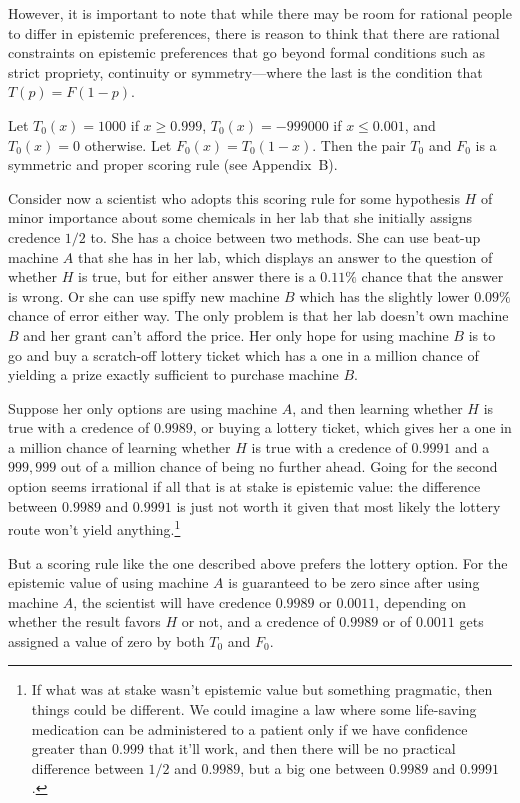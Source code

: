 However, it is important to note that while there may be room for rational people to differ in epistemic preferences, there is reason to
think that there are rational constraints on epistemic preferences that go beyond formal conditions such as strict propriety, continuity
or symmetry---where the last is the condition that $T(p)=F(1-p)$. 

Let $T_0(x)=1000$ if $x\ge 0.999$, $T_0(x)=-999000$ if $x \le 0.001$, and $T_0(x)=0$ otherwise. Let $F_0(x)=T_0(1-x)$.
Then the pair $T_0$ and $F_0$ is a symmetric and proper scoring rule (see Appendix~B).

Consider now a scientist who adopts this scoring rule for some hypothesis $H$ of minor importance about some chemicals in 
her lab that she initially assigns credence $1/2$ to. She has a choice between two methods. She can use beat-up machine $A$
that she has in her lab, which displays an answer to the question of whether $H$ is true, but for either
answer there is a $0.11\%$ chance that the answer is wrong. Or she can use spiffy new machine $B$ which has the slightly lower $0.09\%$ chance 
of error either way. The only problem is that her lab doesn't own machine $B$ and her grant can't afford the price. Her only 
hope for using machine $B$ is to go and buy a scratch-off lottery ticket which has a one in a million chance of yielding a prize exactly
sufficient to purchase machine $B$.

Suppose her only options are using machine $A$, and then learning whether $H$ is true with a credence of
$0.9989$, or buying a lottery ticket, which gives her a one in a million chance of learning whether $H$ is true with
a credence of $0.9991$ and a $999,999$ out of a million chance of being no further ahead. Going for the second option
seems irrational if all that is at stake is epistemic value: the difference between $0.9989$ and $0.9991$ is just not
worth it given that most likely the lottery route won't yield anything.\footnote{If what was at stake
wasn't epistemic value but something pragmatic, then things could be different. We could imagine a law where some 
life-saving medication can be administered to a patient only if we have confidence greater than $0.999$ that it'll work, and then
there will be no practical difference between $1/2$ and $0.9989$, but a big one between $0.9989$ and $0.9991$.}

But a scoring rule like the one described above prefers the lottery option. For the epistemic value of using 
machine $A$ is guaranteed to be zero since after using machine $A$, the scientist will have credence $0.9989$ or $0.0011$, 
depending on whether the result favors $H$ or not, and a credence of $0.9989$ or of $0.0011$ gets assigned a value
of zero by both $T_0$ and $F_0$.

